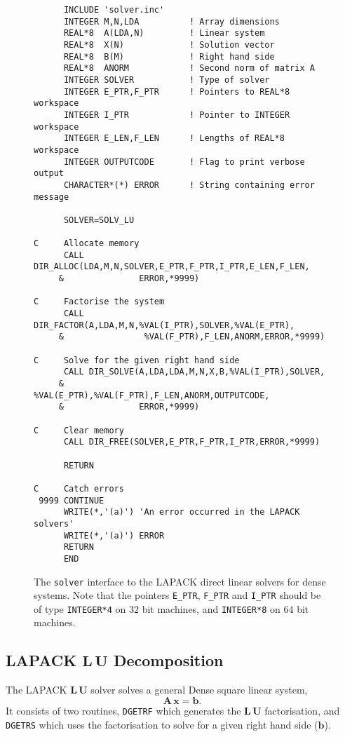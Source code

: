 \begin{figure}[htb]
\begin{small}
\begin{verbatim}
      INCLUDE 'solver.inc'
      INTEGER M,N,LDA          ! Array dimensions
      REAL*8  A(LDA,N)         ! Linear system
      REAL*8  X(N)             ! Solution vector
      REAL*8  B(M)             ! Right hand side
      REAL*8  ANORM            ! Second norm of matrix A
      INTEGER SOLVER           ! Type of solver
      INTEGER E_PTR,F_PTR      ! Pointers to REAL*8 workspace
      INTEGER I_PTR            ! Pointer to INTEGER workspace
      INTEGER E_LEN,F_LEN      ! Lengths of REAL*8 workspace
      INTEGER OUTPUTCODE       ! Flag to print verbose output
      CHARACTER*(*) ERROR      ! String containing error message

      SOLVER=SOLV_LU

C     Allocate memory
      CALL DIR_ALLOC(LDA,M,N,SOLVER,E_PTR,F_PTR,I_PTR,E_LEN,F_LEN,
     &               ERROR,*9999)

C     Factorise the system
      CALL DIR_FACTOR(A,LDA,M,N,%VAL(I_PTR),SOLVER,%VAL(E_PTR),
     &                %VAL(F_PTR),F_LEN,ANORM,ERROR,*9999)

C     Solve for the given right hand side
      CALL DIR_SOLVE(A,LDA,LDA,M,N,X,B,%VAL(I_PTR),SOLVER,
     &               %VAL(E_PTR),%VAL(F_PTR),F_LEN,ANORM,OUTPUTCODE,
     &               ERROR,*9999)

C     Clear memory
      CALL DIR_FREE(SOLVER,E_PTR,F_PTR,I_PTR,ERROR,*9999)

      RETURN

C     Catch errors
 9999 CONTINUE
      WRITE(*,'(a)') 'An error occurred in the LAPACK solvers'
      WRITE(*,'(a)') ERROR
      RETURN
      END
\end{verbatim}
\end{small}
\caption{\label{f2.1} The {\tt solver} interface to the LAPACK direct linear
  solvers for dense systems. Note that the pointers {\tt E\_PTR}, {\tt F\_PTR}
  and {\tt I\_PTR} should be of type {\tt INTEGER*4} on $32$ bit machines, and 
  {\tt INTEGER*8} on $64$ bit machines.}
\end{figure}


\subsection{LAPACK $\mathbf{L \, U}$ Decomposition}\label{s2.1}

The LAPACK $\mathbf{L \, U}$ solver solves a general Dense square linear 
system,
\begin{equation}\label{e2.1.1}
\mathbf{A \, x = b}.
\end{equation}
It consists of two routines, {\tt DGETRF} which generates the $\mathbf{L \, U}$
factorisation, and {\tt DGETRS} which uses the factorisation to solve for a 
given right hand side ($\mathbf{b}$).

